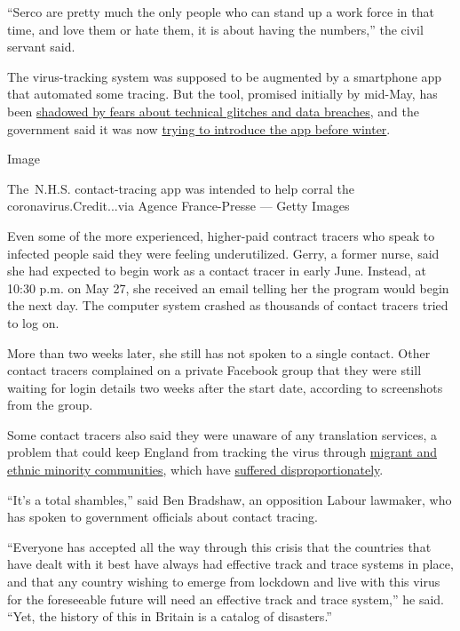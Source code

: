 ``Serco are pretty much the only people who can stand up a work force in
that time, and love them or hate them, it is about having the numbers,''
the civil servant said.

The virus-tracking system was supposed to be augmented by a smartphone
app that automated some tracing. But the tool, promised initially by
mid-May, has been
\href{https://www.nytimes.com/2020/05/07/world/europe/uk-coronavirus-contact-tracing.html}{shadowed
by fears about technical glitches and data breaches}, and the government
said it was now
\href{https://twitter.com/rowlsmanthorpe/status/1273276669541916674}{trying
to introduce the app before winter}.

Image

The~N.H.S. contact-tracing app was intended to help corral the
coronavirus.Credit...via Agence France-Presse --- Getty Images

Even some of the more experienced, higher-paid contract tracers who
speak to infected people said they were feeling underutilized. Gerry, a
former nurse, said she had expected to begin work as a contact tracer in
early June. Instead, at 10:30 p.m. on May 27, she received an email
telling her the program would begin the next day. The computer system
crashed as thousands of contact tracers tried to log on.

More than two weeks later, she still has not spoken to a single contact.
Other contact tracers complained on a private Facebook group that they
were still waiting for login details two weeks after the start date,
according to screenshots from the group.

Some contact tracers also said they were unaware of any translation
services, a problem that could keep England from tracking the virus
through
\href{https://www.nytimes.com/2020/04/08/world/europe/coronavirus-doctors-immigrants.html}{migrant
and ethnic minority communities}, which have
\href{https://www.nytimes.com/2020/05/07/world/europe/coronavirus-uk-black-britons.html}{suffered
disproportionately}.

``It's a total shambles,'' said Ben Bradshaw, an opposition Labour
lawmaker, who has spoken to government officials about contact tracing.

``Everyone has accepted all the way through this crisis that the
countries that have dealt with it best have always had effective track
and trace systems in place, and that any country wishing to emerge from
lockdown and live with this virus for the foreseeable future will need
an effective track and trace system,'' he said. ``Yet, the history of
this in Britain is a catalog of disasters.''

